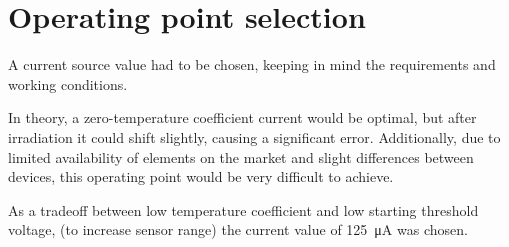 \section{Operating point selection}
    A current source value had to be chosen, keeping in mind the requirements and working conditions.

    In theory, a zero-temperature coefficient current would be optimal, but after irradiation it could shift slightly, causing a significant error. Additionally, due to limited availability of elements on the market and slight differences between devices, this operating point would be very difficult to achieve.

    As a tradeoff between low temperature coefficient and low starting threshold voltage, (to increase sensor range) the current value of \SI{125}{\micro\ampere} was chosen.
